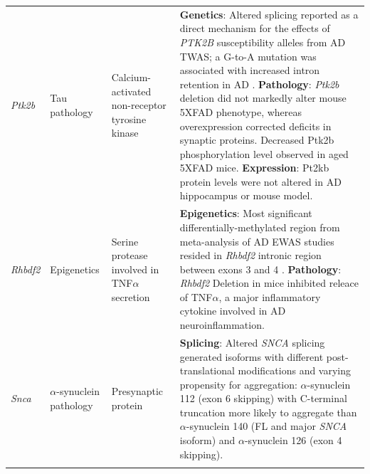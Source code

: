 \begin{landscape}
\begin{longtable}[c]{p{1cm}p{2cm}p{4cm}p{19cm}}
			\centering \textit{Ptk2b} &
			\centering Tau pathology  &
			\centering Calcium-activated non-receptor tyrosine kinase &			
			\tabitem \textbf{Genetics}: Altered splicing reported as a direct mechanism for the effects of \textit{PTK2B} susceptibility alleles from AD TWAS; a G-to-A mutation was associated with increased intron retention in AD \cite{Raj2018}.\newline
			\tabitem \textbf{Pathology}: \textit{Ptk2b} deletion did not markedly alter mouse 5XFAD phenotype, whereas overexpression corrected deficits in synaptic proteins. Decreased Ptk2b phosphorylation level observed in aged 5XFAD mice.\newline
			\tabitem \textbf{Expression}: Pt2kb protein levels were not altered in AD hippocampus or mouse model\cite{Giralt2018}.\\
			\hdashline[0.5pt/5pt]					
		
			\centering \textit{Rhbdf2} &
			\centering Epigenetics  &
			\centering Serine protease involved in TNF$\alpha$ secretion &
			\tabitem \textbf{Epigenetics}: Most significant differentially-methylated region from meta-analysis of AD EWAS studies resided in \textit{Rhbdf2} intronic region between exons 3 and 4 \cite{Smith2021,DeJager2014, Lardenoije2019}.\newline
			\tabitem \textbf{Pathology}: \textit{Rhbdf2} Deletion in mice inhibited releace of TNF$\alpha$, a major inflammatory cytokine involved in AD neuroinflammation\cite{Levy2020}.\\
			
			\centering \textit{Snca} &
			\centering $\alpha$-synuclein pathology  &
			\centering Presynaptic protein &
			\tabitem \textbf{Splicing}: Altered \textit{SNCA} splicing generated isoforms with different post-translational modifications and varying propensity for aggregation: $\alpha$-synuclein 112 (exon 6 skipping) with C-terminal truncation more likely to aggregate than $\alpha$-synuclein 140 (FL and major \textit{SNCA} isoform) and $\alpha$-synuclein 126 (exon 4 skipping)\cite{Beyer2012, Beyer2006}.  \\
			\hdashline[0.5pt/5pt]		
			

\end{longtable}
\end{landscape}
